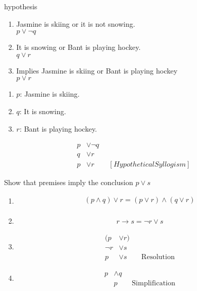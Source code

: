 \documentclass[a4paper, 12pt]{article}
\newenvironment{example}[1][Example]{\begin{trivlist}
\item[\hskip \labelsep {\bfseries #1}]}{\end{trivlist}}
\newcommand{\then}{\rightarrow}
\begin{document}
    \begin{example}
        hypothesis
        \begin{enumerate}
            \item Jasmine is skiing or it is not snowing. \\
            $p \vee \neg q$
            \item It is snowing or Bant is playing hockey. \\
            $q \vee r$
            \item Implies Jasmine is skiing or Bant is playing hockey \\
            $p \vee r$
        \end{enumerate}
        \begin{enumerate}
            \item $p$: Jasmine is skiing.
            \item $q$: It is snowing.
            \item $r$: Bant is playing hockey.
        \end{enumerate}
        \begin{align*}
            p &\vee \neg q \\
            q &\vee r \\
            p &\vee r \quad \quad [Hypothetical Syllogism]
        \end{align*}
    \end{example}
    \begin{example}
        Show that premises imply the conclusion $p \vee s$
        \begin{enumerate}
            \item \begin{align*}
                (p \wedge q) \vee r = (p \vee r) \wedge (q \vee r) \\
            \end{align*}
            \item \begin{align*}
                r \then s = \neg r \vee s
            \end{align*}
            \item \begin{align*}
                (p &\vee r) \\
                \neg r &\vee s \\
                p &\vee s \quad \quad \text{Resolution}
            \end{align*}
            \item \begin{align*}
                p &\wedge q \\
                &p \quad \quad \text{Simplification}
            \end{align*}
        \end{enumerate}
    \end{example}
\end{document}
